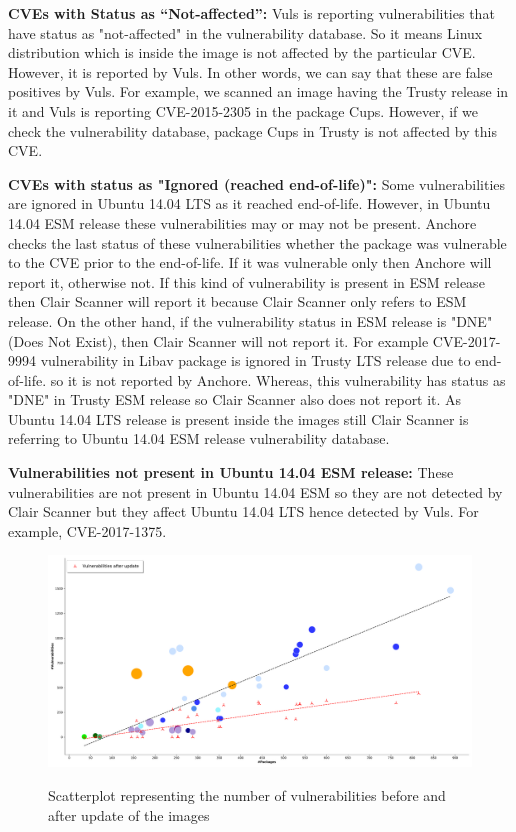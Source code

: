 \documentclass[a4paper,num-refs]{oup-contemporary}
\begin{document}
\textbf{CVEs with Status as “Not-affected”:} Vuls is reporting vulnerabilities that have status
as "not-affected" in the vulnerability database. So it means Linux distribution which is inside the image is not affected
by the particular CVE. However, it is reported by Vuls. In other words, we can say that
these are false positives by Vuls.
For example, we scanned an image having the Trusty release in it and Vuls is reporting CVE-2015-2305
in the package Cups. However, if we check the vulnerability database, package Cups in Trusty is not
affected by this CVE.

\textbf{CVEs with status as "Ignored (reached end-of-life)":}
Some vulnerabilities are ignored in Ubuntu 14.04 LTS as it reached end-of-life. 
However, in Ubuntu 14.04 ESM release these vulnerabilities may or may not be present.
Anchore checks the last status of these vulnerabilities whether the package was vulnerable to the CVE
prior to the end-of-life. If it was vulnerable only then Anchore will report it, otherwise not.
If this kind of vulnerability is present in ESM release then Clair Scanner will report it because Clair Scanner
only refers to ESM release. On the other hand, if the vulnerability
status in ESM release is "DNE" (Does Not Exist), then Clair Scanner will not report it. 
For example CVE-2017-9994 vulnerability in Libav package is ignored in Trusty LTS release due to end-of-life.
so it is not reported by Anchore. Whereas, this vulnerability has status as "DNE" in Trusty ESM
release so Clair Scanner also does not report it. As Ubuntu 14.04 LTS release is present inside the images still
Clair Scanner is referring to Ubuntu 14.04 ESM release vulnerability database.

\textbf{Vulnerabilities not present in Ubuntu 14.04 ESM release:} These vulnerabilities are not present in Ubuntu 14.04 ESM so they 
are not detected by Clair Scanner but they affect Ubuntu 14.04 LTS hence detected by Vuls. For example, CVE-2017-1375.
\begin{figure}[b]
        {\includegraphics[width=\textwidth]
        {Figures/vulnwithupdate.pdf}}
        \caption{\label{fig:graph2} Scatterplot representing the number of vulnerabilities before and
        after update of the images}
      \end{figure}
\end{document}
